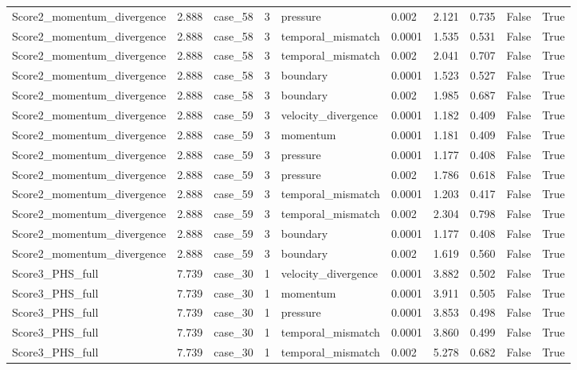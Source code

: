 \begin{longtable}{llllllllll}
Score2\_momentum\_divergence & 2.888 & case\_58 & 3 & pressure & 0.002 & 2.121 & 0.735 & False & True \\
Score2\_momentum\_divergence & 2.888 & case\_58 & 3 & temporal\_mismatch & 0.0001 & 1.535 & 0.531 & False & True \\
Score2\_momentum\_divergence & 2.888 & case\_58 & 3 & temporal\_mismatch & 0.002 & 2.041 & 0.707 & False & True \\
Score2\_momentum\_divergence & 2.888 & case\_58 & 3 & boundary & 0.0001 & 1.523 & 0.527 & False & True \\
Score2\_momentum\_divergence & 2.888 & case\_58 & 3 & boundary & 0.002 & 1.985 & 0.687 & False & True \\
Score2\_momentum\_divergence & 2.888 & case\_59 & 3 & velocity\_divergence & 0.0001 & 1.182 & 0.409 & False & True \\
Score2\_momentum\_divergence & 2.888 & case\_59 & 3 & momentum & 0.0001 & 1.181 & 0.409 & False & True \\
Score2\_momentum\_divergence & 2.888 & case\_59 & 3 & pressure & 0.0001 & 1.177 & 0.408 & False & True \\
Score2\_momentum\_divergence & 2.888 & case\_59 & 3 & pressure & 0.002 & 1.786 & 0.618 & False & True \\
Score2\_momentum\_divergence & 2.888 & case\_59 & 3 & temporal\_mismatch & 0.0001 & 1.203 & 0.417 & False & True \\
Score2\_momentum\_divergence & 2.888 & case\_59 & 3 & temporal\_mismatch & 0.002 & 2.304 & 0.798 & False & True \\
Score2\_momentum\_divergence & 2.888 & case\_59 & 3 & boundary & 0.0001 & 1.177 & 0.408 & False & True \\
Score2\_momentum\_divergence & 2.888 & case\_59 & 3 & boundary & 0.002 & 1.619 & 0.560 & False & True \\
Score3\_PHS\_full & 7.739 & case\_30 & 1 & velocity\_divergence & 0.0001 & 3.882 & 0.502 & False & True \\
Score3\_PHS\_full & 7.739 & case\_30 & 1 & momentum & 0.0001 & 3.911 & 0.505 & False & True \\
Score3\_PHS\_full & 7.739 & case\_30 & 1 & pressure & 0.0001 & 3.853 & 0.498 & False & True \\
Score3\_PHS\_full & 7.739 & case\_30 & 1 & temporal\_mismatch & 0.0001 & 3.860 & 0.499 & False & True \\
Score3\_PHS\_full & 7.739 & case\_30 & 1 & temporal\_mismatch & 0.002 & 5.278 & 0.682 & False & True \\

\end{longtable}
